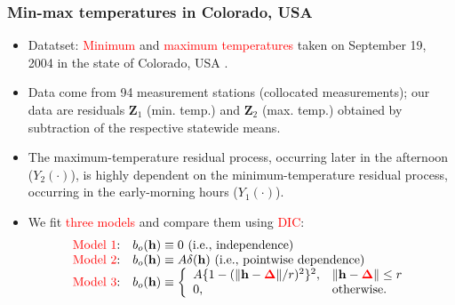 \documentclass{beamer}
\newcommand{\Deltab} {\boldsymbol{\Delta}}
\newcommand{\h}{\mathbf{h}}
\begin{document}
\begin{frame}
\frametitle{Min-max temperatures in Colorado, USA}

\begin{itemize}
\item Datatset: \textcolor{red}{Minimum} and \textcolor{red}{maximum temperatures} taken on September 19, 2004 in the state of Colorado, USA \citep{GentonKleiber2015}.
\item Data come from 94 measurement stations (collocated measurements); our data are residuals $\mathbf{Z}_1$ (min. temp.) and $\mathbf{Z}_2$ (max. temp.) obtained by subtraction of the respective statewide means.
\item The maximum\hyp{}temperature residual process, occurring later in the afternoon ($Y_2(\cdot)$), is highly dependent on the minimum\hyp{}temperature residual process, occurring in the early-morning hours ($Y_1(\cdot)$).
\item We fit \textcolor{red}{three models} and compare them using \textcolor{red}{DIC}:
\begin{equation*}
\begin{array}{ll}
\textrm{\textcolor{red}{Model 1}:} &b_o(\h) \equiv 0 \mbox{ (i.e., independence)}\\
\textrm{\textcolor{red}{Model 2}:} &b_o(\h) \equiv A\delta(\h) \mbox{ (i.e., pointwise dependence)}\\
\textrm{\textcolor{red}{Model 3}:} &b_o(\h) \equiv \left\{\begin{array}{ll} A\{1 - (\|\h - \textcolor{red}{\Deltab}\|/r)^2\}^2, & \| \h - \textcolor{red}{\Deltab}\| \le r \\ 0, & \textrm{otherwise}. \end{array} \right.
\end{array}
\end{equation*}
\end{itemize}
\end{frame}

\end{document}
